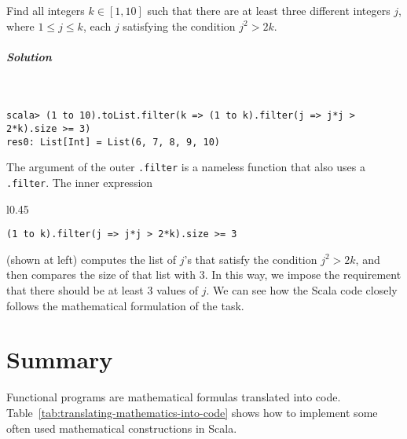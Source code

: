 Find all integers $k\in\left[1,10\right]$ such that there are at
least three different integers $j$, where $1\leq j\leq k$, each
$j$ satisfying the condition $j^{2}>2k$.

\subparagraph{Solution}

~

\begin{lstlisting}
scala> (1 to 10).toList.filter(k => (1 to k).filter(j => j*j > 2*k).size >= 3)
res0: List[Int] = List(6, 7, 8, 9, 10) 
\end{lstlisting}
The argument of the outer \lstinline!.filter! is a nameless function
that also uses a \lstinline!.filter!. The inner expression

\noindent \begin{wrapfigure}{l}{0.45\columnwidth}%
\vspace{-0.8\baselineskip}
\begin{lstlisting}
(1 to k).filter(j => j*j > 2*k).size >= 3
\end{lstlisting}

\vspace{-1.5\baselineskip}
\end{wrapfigure}%
 (shown at left) computes the list of $j$'s that satisfy the condition
$j^{2}>2k$, and then compares the size of that list with $3$. In
this way, we impose the requirement that there should be at least
$3$ values of $j$. We can see how the Scala code closely follows
the mathematical formulation of the task.

\section{Summary}

Functional programs are mathematical formulas translated into code.
Table~\ref{tab:translating-mathematics-into-code} shows how to implement
some often used mathematical constructions in Scala.

